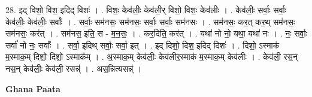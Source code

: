 \documentclass[17pt]{extarticle}
\begin{document}
28. इद् विशो॒ विश॒ इदिद् विशः॑ । . विशः॒ केव॑लीः॒ केव॑ली॒र् विशो॒ विशः॒ केव॑लीः । . केव॑लीः॒ सर्वाः॒ सर्वाः॒ केव॑लीः॒ केव॑लीः॒ सर्वाः᳚ । . सर्वाः॒ सम॑नसः॒ सम॑नसः॒ सर्वाः॒ सर्वाः॒ सम॑नसः । . सम॑नसः॒ कर॒त् कर॒थ् सम॑नसः॒ सम॑नसः॒ कर॑त् । . सम॑नस॒ इति॒ स - म॒न॒सः॒ । . कर॒दिति॒ कर॑त् । . यथा॑ नो नो॒ यथा॒ यथा॑ नः । . नः॒ सर्वाः॒ सर्वा॑ नो नः॒ सर्वाः᳚ । . सर्वा॒ इदिथ् सर्वाः॒ सर्वा॒ इत् । . इद् दिशो॒ दिश॒ इदिद् दिशः॑ । . दिशो॒ ऽस्माक॑ म॒स्माक॒म् दिशो॒ दिशो॒ ऽस्माक᳚म् । . अ॒स्माक॒म् केव॑लीः॒ केव॑लीर॒स्माक॑ म॒स्माक॒म् केव॑लीः । . केव॑ली॒ रस॒न् नस॒न् केव॑लीः॒ केव॑ली॒ रसन्न्॑ । . अस॒न्नित्यसन्न्॑ । \newline

\textbf{Ghana Paata } \newline
\end{document}

